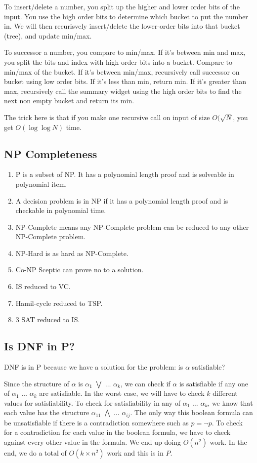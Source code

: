 \documentclass[12pt,twocolumn]{article}
\begin{document}
To insert/delete a number, you split up the higher and lower order bits of the input. You use the high order bits to determine which bucket to put the number in. We will then recurisvely insert/delete the lower-order bits into that bucket (tree), and update min/max.

To successor a number, you compare to min/max. If it's between min and max, you split the bits and index with high order bits into a bucket. Compare to min/max of the bucket. If it's between min/max, recursively call successor on bucket using low order bits. If it's less than min, return min. If it's greater than max, recursively call the summary widget using the high order bits to find the next non empty bucket and return its min.

The trick here is that if you make one recursive call on input of size $O(\sqrt{N}$, you get $O(\log \log N)$ time.

\subsection{NP Completeness}
\begin{enumerate}
    \item P is a subset of NP. It has a polynomial length proof and is solveable in polynomial item.
    \item A decision problem is in NP if it has a polynomial length proof and is checkable in polynomial time.
    \item NP-Complete means any NP-Complete problem can be reduced to any other NP-Complete problem.
    \item NP-Hard is as hard as NP-Complete.
    \item Co-NP Sceptic can prove no to a solution.
    \item IS reduced to VC.
    \item Hamil-cycle reduced to TSP.
    \item 3 SAT reduced to IS.
\end{enumerate}

\subsection{ Is DNF in P? }
DNF is in P because we have a solution for the problem: is $\alpha$ satisfiable?

Since the structure of $\alpha$ is $\alpha_1$ $\bigvee$ $\dots$ $\alpha_k$, we can check if $\alpha$ is satisfiable if any one of $\alpha_1$ $\dots$ $\alpha_k$ are satisfiable. In the worst case, we will have to check $k$ different values for satisfiability.
To check for satisfiability in any of $\alpha_1$ $\dots$ $\alpha_k$, we know that each value has the structure $\alpha_{11}$ $\bigwedge$ $\dots$ $\alpha_{ij}$. The only way this boolean formula can be unsatisfiable if there is a contradiction somewhere such as $p = \neg p$. To check for a contradiction for each value in the boolean formula, we have to check against every other value in the formula. We end up doing $O(n^2)$ work.
In the end, we do a total of $O(k \times n^2)$ work and this is in $P$.
\end{document}
